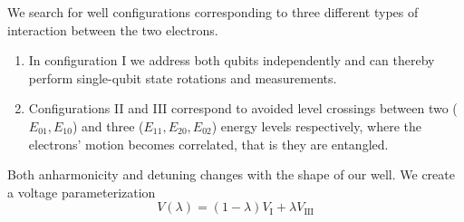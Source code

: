 \documentclass{beamer}
\begin{document}
\begin{frame}

We search for well configurations corresponding to three different types of interaction between the two electrons.

\begin{enumerate}
\item In configuration I we address both qubits independently and can thereby perform single-qubit state rotations and measurements.

\item Configurations II and III correspond to avoided level crossings between two ($E_{01}, E_{10}$) and three ($E_{11}, E_{20}, E_{02}$) energy levels respectively, where the electrons' motion becomes correlated, that is they are entangled. 
\end{enumerate}

\noindent
Both anharmonicity and detuning changes with the shape of our well.
We create a voltage parameterization
\begin{equation}
V(\lambda) = (1-\lambda)V_\mathrm{I} + \lambda V_\mathrm{III}
\end{equation}
\end{frame}
\end{document}
